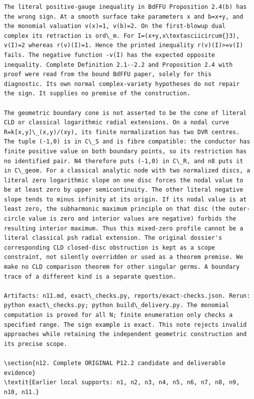 \documentclass[11pt]{article}
\begin{document}
\begin{Verbatim}[breaklines,fontsize=\tiny]
The literal positive-gauge inequality in BdFFU Proposition 2.4(b) has the wrong sign. At a smooth surface take parameters x and b=x+y, and the monomial valuation v(x)=1, v(b)=2. On the first-blowup dual complex its retraction is ord\_m. For I=(x+y,x\textasciicircum{}3), v(I)=2 whereas r(v)(I)=1. Hence the printed inequality r(v)(I)>=v(I) fails. The negative function -v(I) has the expected opposite inequality. Complete Definition 2.1--2.2 and Proposition 2.4 with proof were read from the bound BdFFU paper, solely for this diagnostic. Its own normal complex-variety hypotheses do not repair the sign. It supplies no premise of the construction.

The geometric boundary cone is not asserted to be the cone of literal CLD or classical logarithmic radial extensions. On a nodal curve R=k[x,y]\_(x,y)/(xy), its finite normalization has two DVR centres. The tuple (-1,0) is in C\_S and is fibre compatible: the conductor has finite positive value on both boundary points, so its restriction has no identified pair. N4 therefore puts (-1,0) in C\_R, and n8 puts it in C\_geom. For a classical analytic node with two normalized discs, a literal zero logarithmic slope on one disc forces the nodal value to be at least zero by upper semicontinuity. The other literal negative slope tends to minus infinity at its origin. If its nodal value is at least zero, the subharmonic maximum principle on that disc (the outer-circle value is zero and interior values are negative) forbids the resulting interior maximum. Thus this mixed-zero profile cannot be a literal classical psh radial extension. The original dossier's corresponding CLD closed-disc obstruction is kept as a scope constraint, not silently overridden or used as a theorem premise. We make no CLD comparison theorem for other singular germs. A boundary trace of a different kind is a separate question.

Artifacts: n11.md, exact\_checks.py, reports/exact-checks.json. Rerun: python exact\_checks.py; python build\_delivery.py. The monomial computation is proved for all N; finite enumeration only checks a specified range. The sign example is exact. This note rejects invalid approaches while retaining the independent geometric construction and its precise scope.

\section{n12. Complete ORIGINAL P12.2 candidate and deliverable evidence}
\textit{Earlier local supports: n1, n2, n3, n4, n5, n6, n7, n8, n9, n10, n11.}


\end{Verbatim}
\end{document}
